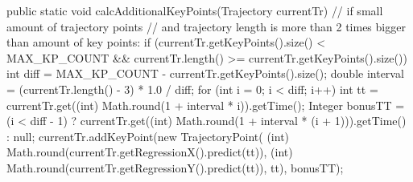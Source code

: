 public static void calcAdditionalKeyPoints(Trajectory currentTr) {
//	  if small amount of trajectory points
//	  and trajectory length is more than 2 times bigger than amount of key points:
	if (currentTr.getKeyPoints().size() < MAX_KP_COUNT && currentTr.length() >= currentTr.getKeyPoints().size()) {
		int diff = MAX_KP_COUNT - currentTr.getKeyPoints().size();
		double interval = (currentTr.length() - 3) * 1.0 / diff;
		for (int i = 0; i < diff; i++) {
			int tt = currentTr.get((int) Math.round(1 + interval * i)).getTime();
			Integer bonusTT = (i < diff - 1) ? currentTr.get((int) Math.round(1 + interval * (i + 1))).getTime() : null;
			currentTr.addKeyPoint(new TrajectoryPoint(
			(int) Math.round(currentTr.getRegressionX().predict(tt)),
			(int) Math.round(currentTr.getRegressionY().predict(tt)),
			tt), bonusTT);
		}
	}
}